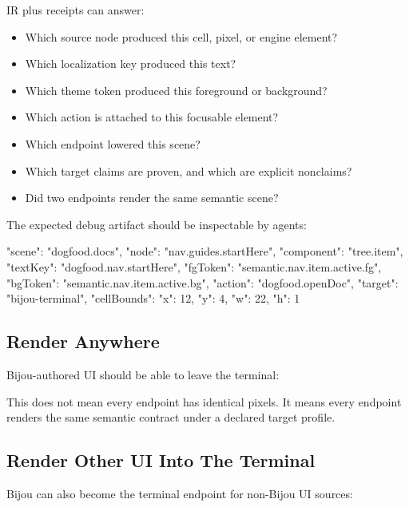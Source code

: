 IR plus receipts can answer:

\begin{itemize}
\tightlist
\item
  Which source node produced this cell, pixel, or engine element?
\item
  Which localization key produced this text?
\item
  Which theme token produced this foreground or background?
\item
  Which action is attached to this focusable element?
\item
  Which endpoint lowered this scene?
\item
  Which target claims are proven, and which are explicit nonclaims?
\item
  Did two endpoints render the same semantic scene?
\end{itemize}

The expected debug artifact should be inspectable by agents:

\begin{CodeBlock}
{
  "scene": "dogfood.docs",
  "node": "nav.guides.startHere",
  "component": "tree.item",
  "textKey": "dogfood.nav.startHere",
  "fgToken": "semantic.nav.item.active.fg",
  "bgToken": "semantic.nav.item.active.bg",
  "action": "dogfood.openDoc",
  "target": "bijou-terminal",
  "cellBounds": { "x": 12, "y": 4, "w": 22, "h": 1 }
}
\end{CodeBlock}

\subsection{Render Anywhere}\label{record-139-render-anywhere}

Bijou-authored UI should be able to leave the terminal:



This does not mean every endpoint has identical pixels. It means every endpoint renders the same semantic contract under a declared target profile.

\subsection{Render Other UI Into The Terminal}\label{record-139-render-other-ui-into-the-terminal}

Bijou can also become the terminal endpoint for non-Bijou UI sources:



